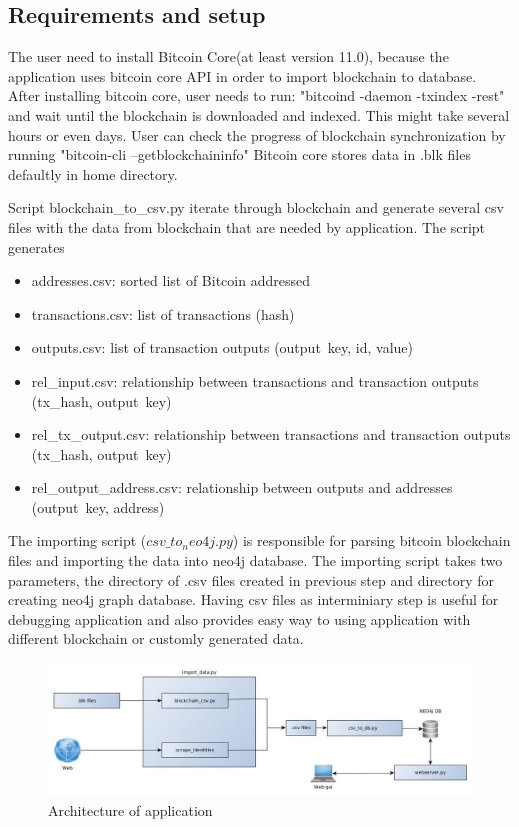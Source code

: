 \documentclass[
  digital, %
  table,   %
  lof,     %
  lot,     %
  oneside
]{fithesis3}
\begin{document}
\begin{appendices}
\chapter{Requirements and setup }

The user need to install Bitcoin Core(at least version 11.0), because 
the application uses bitcoin core API in order to import blockchain to database.
After installing bitcoin core, user needs to run:
"bitcoind -daemon -txindex -rest"
and wait until the blockchain is downloaded and indexed. This might take several hours or even days.
User can check the progress of blockchain synchronization by running
"bitcoin-cli --getblockchaininfo"
Bitcoin core stores data in .blk files defaultly in home directory.

Script blockchain\_to\_csv.py iterate through blockchain
and generate several csv files with the data from blockchain that are needed by application.
The script generates
\begin{itemize} %
 \item addresses.csv: sorted list of Bitcoin addressed
 \item transactions.csv: list of transactions (hash)
 \item outputs.csv: list of transaction outputs (output\ key, id, value)
 \item rel\_input.csv: relationship between transactions and transaction outputs (tx\_hash, output\ key)
 \item rel\_tx\_output.csv: relationship between transactions and transaction outputs (tx\_hash, output\ key)
 \item rel\_output\_address.csv: relationship between outputs and addresses (output\ key, address)
\end{itemize}

The importing script ($csv\_to_neo4j.py$) is responsible for parsing bitcoin blockchain files and importing the data into neo4j database.
The importing script takes two parameters, the directory of .csv files created in previous step
and directory for creating neo4j graph database.
Having csv files as interminiary step is useful for debugging application and also provides easy way to
using application with different blockchain or customly generated data.

\begin{figure}[!htb]
    \centering
    \includegraphics[width=1\textwidth]{application_architecture}
    \caption{Architecture of application}
    \label{application_architecture}
\end{figure}


\end{appendices}
\end{document}
